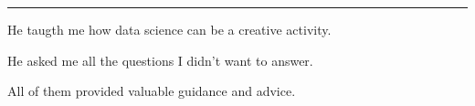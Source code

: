 \vspace*{2.5cm}

\vspace{.3em}
\hrule
\vspace{.5em}
\large{

    He taugth me how data science can be a creative activity.


    He asked me all the questions I didn't want to answer.




    \vspace{1cm}
    All of them provided valuable guidance and advice.
}
\normalsize

\pagebreak
